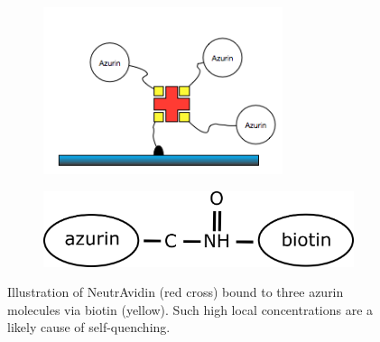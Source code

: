 \documentclass[twoside,single]{lion-msc}
\begin{document}
\begin{figure}[ht!]
\begin{subfigure}{.5\textwidth}

\includegraphics[width=70mm]{ratio_avadin}
\end{subfigure}%
\begin{subfigure}{.5\textwidth}
\includegraphics[width=.8\linewidth]{prot_neutr}
\end{subfigure}
\caption{Illustration of NeutrAvidin (red cross) bound to three azurin molecules via biotin (yellow). Such high local concentrations are a likely cause of self-quenching.}
\label{avidinratio}
\end{figure}
\end{document}
